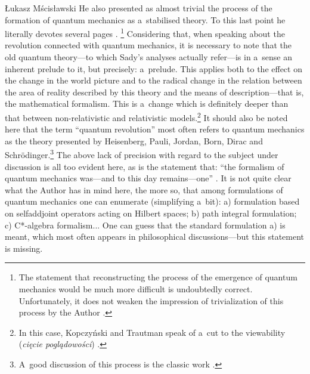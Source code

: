\begin{newrevengenv}{Łukasz Mścisławski}
He also presented as almost trivial the process of the formation of quantum mechanics as a~stabilised theory. To this last point he literally devotes several pages
\parencite[cf.][pp.203--207]{sady_struktura_2020}.%
\footnote{The statement that reconstructing the process of the emergence of quantum mechanics would be much more difficult is undoubtedly correct. Unfortunately, it does not weaken the impression of trivialization of this process by the Author 
\parencite[cf.][p.219]{sady_struktura_2020}.%
} Considering that, when speaking about the revolution connected with quantum mechanics, it is necessary to note that the old quantum theory---to which Sady's analyses actually refer---is in a~sense an inherent prelude to it, but precisely: a~prelude. This applies both to the effect on the change in the world picture and to the radical change in the relation between the area of reality described by this theory and the means of description---that is, the mathematical formalism. This is a~change which is definitely deeper than that between non-relativistic and relativistic models.\footnote{In this case, Kopczyński and Trautman speak of a~cut to the viewability (\textit{cięcie poglądowości}) 
\parencite[cf.][p.24]{kopczynski_czasoprzestrzen_1984}.%
} It should also be noted here that the term ``quantum revolution'' most often refers to quantum mechanics as the theory presented by Heisenberg, Pauli, Jordan, Born, Dirac and Schrödinger.\footnote{A~good discussion of this process is the classic work 
\parencite[][]{jammer_1966}.%
} The above lack of precision with regard to the subject under discussion is all too evident here, as is the statement that: ``the formalism of quantum mechanics was---and to this day remains---one'' 
\parencite[cf.][p.207]{sady_struktura_2020}. %
 It is not quite clear what the Author has in mind here, the more so, that among formulations of quantum mechanics one can enumerate (simplifying a~bit): a) formulation based on selfaddjoint operators acting on Hilbert spaces; b) path integral formulation; c) C*-algebra formalism... One can guess that the standard formulation a) is meant, which most often appears in philosophical discussions---but this statement is missing.


\end{newrevengenv}
